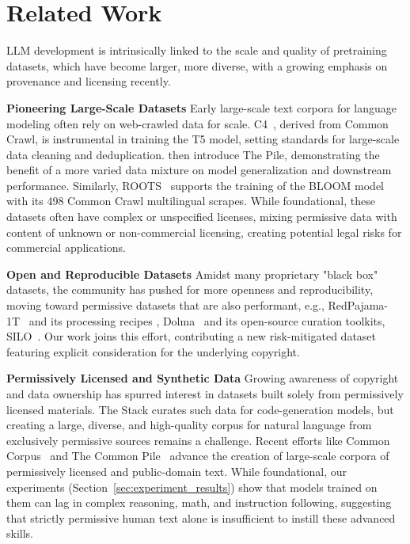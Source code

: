 \section{Related Work}
\label{sec:related_work}

LLM development is intrinsically linked to the scale and quality of pretraining datasets, which have become larger, more diverse, with a growing emphasis on provenance and licensing recently.

\textbf{Pioneering Large-Scale Datasets} Early large-scale text corpora for language modeling often rely on web-crawled data for scale. C4~\citep{raffel2020exploring}, derived from Common Crawl, is instrumental in training the T5 model, setting standards for large-scale data cleaning and deduplication. \citet{gao2020pile} then introduce The Pile, demonstrating the benefit of a more varied data mixture on model generalization and downstream performance. Similarly, ROOTS~\citep{NEURIPS2022_ce9e92e3} supports the training of the BLOOM model with its 498 Common Crawl multilingual scrapes. While foundational, these datasets often have complex or unspecified licenses, mixing permissive data with content of unknown or non-commercial licensing, creating potential legal risks for commercial applications.

\textbf{Open and Reproducible Datasets}
Amidst many proprietary "black box" datasets, the community has pushed for more openness and reproducibility, moving toward permissive datasets that are also performant, e.g., RedPajama-1T~\citep{weber2024redpajama} and its processing recipes \citep{touvron2023llamaopenefficientfoundation}, Dolma~\citep{soldaini2024dolma} and its open-source curation toolkits, SILO~\citep{min2024silo}. Our work joins this effort, contributing a new risk-mitigated dataset featuring explicit consideration for the underlying copyright.

\textbf{Permissively Licensed and Synthetic Data}
Growing awareness of copyright and data ownership has spurred interest in datasets built solely from permissively licensed materials. The Stack \citep{kocetkov2023the} curates such data for code-generation models, but creating a large, diverse, and high-quality corpus for natural language from exclusively permissive sources remains a challenge. Recent efforts like Common Corpus~\citep{langlais2025commoncorpuslargestcollection} and The Common Pile~\citep{kandpal2025commonpilev018tb} advance the creation of large-scale corpora of permissively licensed and public-domain text. While foundational, our experiments (Section~\ref{sec:experiment_results}) show that models trained on them can lag in complex reasoning, math, and instruction following, suggesting that strictly permissive human text alone is insufficient to instill these advanced skills.

